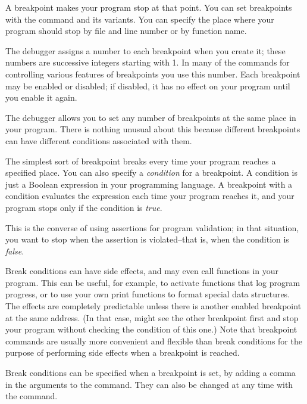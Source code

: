  A breakpoint makes your program stop at that
point. You can set breakpoints with the  command and its
variants. You can specify the place where your program should stop by
file and line number or by function name.

The debugger assigns a number to each breakpoint when you create it;
these numbers are successive integers starting with 1.  In many of the
commands for controlling various features of breakpoints you use this
number.  Each breakpoint may be enabled or disabled; if disabled, it
has no effect on your program until you enable it again.

The debugger allows you to set any number of breakpoints at the same
place in your program.  There is nothing unusual about this because
different breakpoints can have different conditions associated with them.

The simplest sort of breakpoint breaks every time your program reaches
a specified place.  You can also specify a \emph{condition} for a
breakpoint.  A condition is just a Boolean expression in your
programming language.  A breakpoint with a condition evaluates the
expression each time your program reaches it, and your program stops
only if the condition is \emph{true}.

This is the converse of using assertions for program validation; in
that situation, you want to stop when the assertion is violated--that
is, when the condition is \emph{false}.

Break conditions can have side effects, and may even call functions in
your program.  This can be useful, for example, to activate functions
that log program progress, or to use your own print functions to
format special data structures. The effects are completely predictable
unless there is another enabled breakpoint at the same address.  (In
that case,  might see the other breakpoint first and stop your
program without checking the condition of this one.)  Note that
breakpoint commands are usually more convenient and flexible than break
conditions for the
purpose of performing side effects when a breakpoint is reached.

Break conditions can be specified when a breakpoint is set, by adding
a comma in the arguments to the  command. They can also be
changed at any time with the  command.


